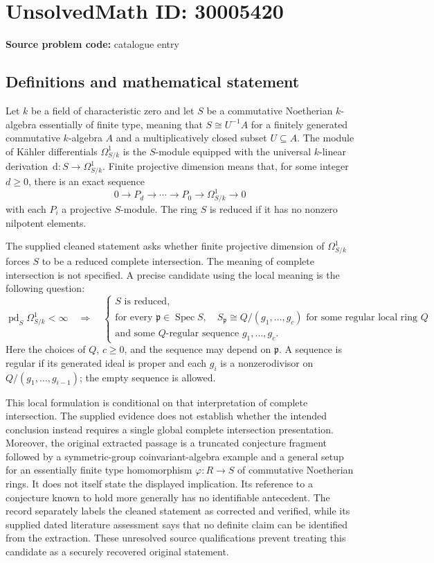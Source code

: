 \documentclass[11pt]{article}
\newcommand{\dd}{\,\mathrm{d}}
\begin{document}
\section*{UnsolvedMath ID: 30005420}
\textbf{Source problem code:} catalogue entry
\subsection{Definitions and mathematical statement}
Let \(k\) be a field of characteristic zero and let \(S\) be a commutative Noetherian \(k\)-algebra essentially of finite type, meaning that \(S\cong U^{-1}A\) for a finitely generated commutative \(k\)-algebra \(A\) and a multiplicatively closed subset \(U\subseteq A\). The module of K\"ahler differentials \(\Omega^1_{S/k}\) is the \(S\)-module equipped with the universal \(k\)-linear derivation \(\dd:S\to\Omega^1_{S/k}\). Finite projective dimension means that, for some integer \(d\geq 0\), there is an exact sequence
\[
0\longrightarrow P_d\longrightarrow\cdots\longrightarrow P_0\longrightarrow\Omega^1_{S/k}\longrightarrow 0
\]
with each \(P_i\) a projective \(S\)-module. The ring \(S\) is reduced if it has no nonzero nilpotent elements.

The supplied cleaned statement asks whether finite projective dimension of \(\Omega^1_{S/k}\) forces \(S\) to be a reduced complete intersection. The meaning of complete intersection is not specified. A precise candidate using the local meaning is the following question:
\[
\operatorname{pd}_S\Omega^1_{S/k}<\infty
\quad\Longrightarrow\quad
\left\{\begin{array}{l}
S\text{ is reduced},\\
\text{for every }\mathfrak p\in\operatorname{Spec}S,\quad
S_{\mathfrak p}\cong Q/(g_1,\ldots,g_c)\text{ for some regular local ring }Q\\
\text{and some }Q\text{-regular sequence }g_1,\ldots,g_c.
\end{array}\right.
\]
Here the choices of \(Q\), \(c\geq0\), and the sequence may depend on \(\mathfrak p\). A sequence is regular if its generated ideal is proper and each \(g_i\) is a nonzerodivisor on \(Q/(g_1,\ldots,g_{i-1})\); the empty sequence is allowed.

This local formulation is conditional on that interpretation of complete intersection. The supplied evidence does not establish whether the intended conclusion instead requires a single global complete intersection presentation. Moreover, the original extracted passage is a truncated conjecture fragment followed by a symmetric-group coinvariant-algebra example and a general setup for an essentially finite type homomorphism \(\varphi:R\to S\) of commutative Noetherian rings. It does not itself state the displayed implication. Its reference to a conjecture known to hold more generally has no identifiable antecedent. The record separately labels the cleaned statement as corrected and verified, while its supplied dated literature assessment says that no definite claim can be identified from the extraction. These unresolved source qualifications prevent treating this candidate as a securely recovered original statement.
\end{document}
